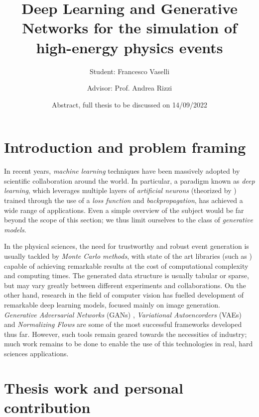 \documentclass{scrartcl} %
\title{Deep Learning and Generative Networks for the simulation of high-energy physics events}
\author{Student: Francesco Vaselli \and
	Advisor: Prof. Andrea Rizzi}
\date{Abstract, full thesis to be discussed on 14/09/2022}
\newcommand{\quickcharcount}[1]{%
	\immediate\write18{texcount -1 -sum -merge -char #1.tex > #1-chars.sum}%
	\openin\tmp=#1-chars.sum%
	\read\tmp to \thechar%
	\closein\tmp%
}
\newcommand{\quickwordcount}[1]{%
	\immediate\write18{texcount -1 -sum -merge #1.tex > #1-words.sum}%
	\openin\tmp=#1-words.sum%
	\read\tmp to \theword%
	\closein\tmp%
}
\begin{document}
	\maketitle
	
	
	\section*{Introduction and problem framing}
	In recent years, \emph{machine learning} techniques have been massively adopted by scientific collaboration around the world. In particular, a paradigm known as \emph{deep learning}, which leverages multiple layers of \emph{artificial neurons} (theorized by \cite{Rosenblatt1958ThePA}) trained through the use of a \emph{loss function} and \emph{backpropagation}, has achieved a wide range of applications. Even a simple overview of the subject would be far beyond the scope of this section; we thus limit ourselves to the class of \emph{generative models}.
	
	In the physical sciences, the need for trustworthy and robust event generation is usually tackled by \emph{Monte Carlo methods}, with state of the art libraries (such as \cite{AGOSTINELLI2003250}) capable of achieving remarkable results at the cost of computational complexity and computing times. The generated data structure is usually tabular or sparse, but may vary greatly between different experiments and collaborations. On the other hand, research in the field of computer vision has fuelled development of remarkable deep learning models, focused mainly on image generation. \emph{Generative Adversarial Networks} (GANs) \cite{goodfellow2014generative}, \emph{Variational Autoencorders} (VAEs) \cite{kingma2014autoencoding} and \emph{Normalizing Flows} \cite{rezende2016variational} are some of the most successful frameworks developed thus far. However, such tools remain geared towards the necessities of industry; much work remains to be done to enable the use of this technologies in real, hard sciences applications.
	
	\section*{Thesis work and personal contribution}
	
\end{document}
